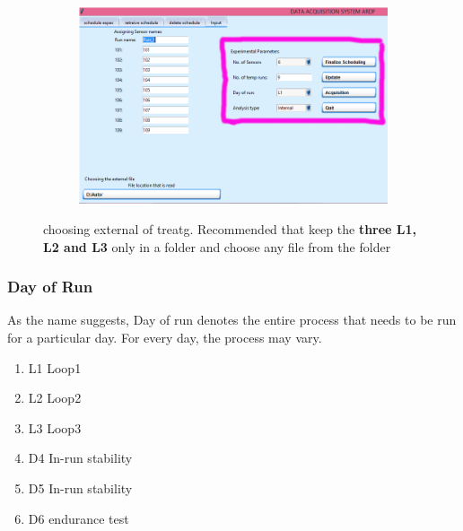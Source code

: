 \documentclass[12pt]{article}
\begin{document}
    
    \begin{figure}[H]
 
    \begin{subfigure}{1.0\textwidth}
    \includegraphics[scale=0.5]{images/experiemntal_parameters.png} 
    \label{fig:DJp1}
    \end{subfigure}
 
 \caption{choosing external of treatg. Recommended that keep the \textbf{three L1, L2  and L3} only in a folder and choose any file from the folder}
\label{fig6}
\end{figure}
    
    
    
    \subsubsection{Day of Run}
    As the name suggests, Day of run denotes the entire process that needs to be run for a particular day. For every day, the process may vary. 
    \begin{enumerate}
        \item L1  Loop1
        \item L2  Loop2
        \item L3  Loop3
        \item D4  In-run stability   
        \item D5  In-run stability
        \item D6  endurance test
    \end{enumerate}
    
\end{document}
